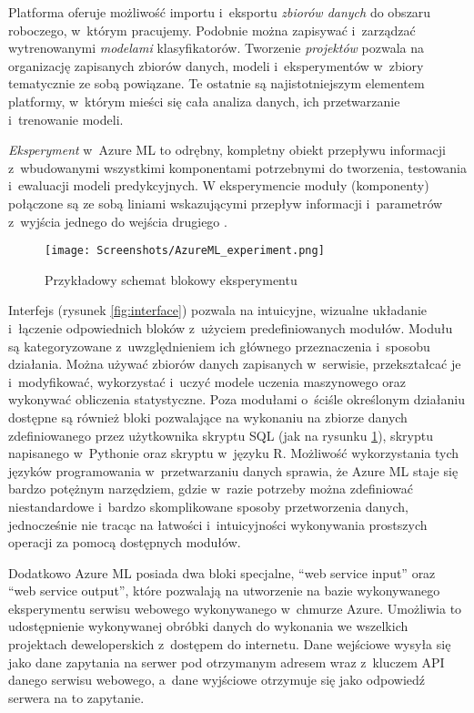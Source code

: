 Platforma oferuje możliwość importu i~eksportu \emph{zbiorów danych} do obszaru roboczego, w~którym pracujemy.
Podobnie można zapisywać i~zarządzać wytrenowanymi \emph{modelami} klasyfikatorów.
Tworzenie \emph{projektów} pozwala na organizację zapisanych zbiorów danych, modeli i~eksperymentów w~zbiory tematycznie ze sobą powiązane.
Te ostatnie są najistotniejszym elementem platformy, w~którym mieści się cała analiza danych, ich przetwarzanie i~trenowanie modeli.

\emph{Eksperyment} w~Azure ML to odrębny, kompletny obiekt przepływu informacji z~wbudowanymi wszystkimi komponentami potrzebnymi do tworzenia, testowania i~ewaluacji modeli predykcyjnych.
W eksperymencie moduły (komponenty) połączone są ze sobą liniami wskazującymi przepływ informacji i~parametrów z~wyjścia jednego do wejścia drugiego \cite{barga2015introducing}.

\begin{figure}[ht]
	\texttt{[image: Screenshots/AzureML\_experiment.png]}
	\caption{Przykładowy schemat blokowy eksperymentu}
	\label{fig:experiment}
\end{figure}

Interfejs (rysunek \ref{fig:interface}) pozwala na intuicyjne, wizualne układanie i~łączenie odpowiednich bloków z~użyciem predefiniowanych modułów.
Modułu są kategoryzowane z~uwzględnieniem ich głównego przeznaczenia i~sposobu działania.
Można używać zbiorów danych zapisanych w~serwisie, przekształcać je i~modyfikować, wykorzystać i~uczyć modele uczenia maszynowego oraz wykonywać obliczenia statystyczne.
Poza modułami o~ściśle określonym działaniu dostępne są również bloki pozwalające na wykonaniu na zbiorze danych zdefiniowanego przez użytkownika skryptu SQL (jak na rysunku \ref{fig:experiment}), skryptu napisanego w~Pythonie oraz skryptu w~języku R.
Możliwość wykorzystania tych języków programowania w~przetwarzaniu danych sprawia, że Azure ML staje się bardzo potężnym narzędziem, gdzie w~razie potrzeby można zdefiniować niestandardowe i~bardzo skomplikowane sposoby przetworzenia danych, jednocześnie nie tracąc na łatwości i~intuicyjności wykonywania prostszych operacji za pomocą dostępnych modułów.

Dodatkowo Azure ML posiada dwa bloki specjalne, ``web service input'' oraz ``web service output'', które pozwalają na utworzenie na bazie wykonywanego eksperymentu serwisu webowego wykonywanego w~chmurze Azure.
Umożliwia to udostępnienie wykonywanej obróbki danych do wykonania we wszelkich projektach deweloperskich z~dostępem do internetu.
Dane wejściowe wysyła się jako dane zapytania na serwer pod otrzymanym adresem wraz z~kluczem API danego serwisu webowego, a~dane wyjściowe otrzymuje się jako odpowiedź serwera na to zapytanie.
